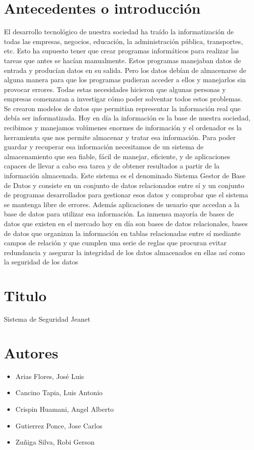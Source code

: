 \documentclass[12pt,letterpaper]{article}
\begin{document}
\section{Antecedentes o introducción}
El desarrollo tecnológico de nuestra sociedad ha traído la informatización de todas las empresas, negocios, educación, la administración pública, transportes, etc. Esto ha supuesto tener que crear programas informáticos para realizar las tareas que antes se hacían manualmente. Estos programas manejaban datos de entrada y producían datos en su salida. Pero los datos debían de almacenarse de alguna manera para que los programas pudieran acceder a ellos y manejarlos sin provocar errores. Todas estas necesidades hicieron que algunas personas y empresas comenzaran a investigar cómo poder solventar todos estos problemas. Se crearon modelos de datos que permitían representar la información real que debía ser informatizada.
Hoy en día la información es la base de nuestra sociedad, recibimos y manejamos volúmenes enormes de información y el ordenador es la herramienta que nos permite almacenar y tratar esa información.
Para poder guardar y recuperar esa información necesitamos de un sistema de almacenamiento que sea fiable, fácil de manejar, eficiente, y de aplicaciones capaces de llevar a cabo esa tarea y de obtener resultados a partir de la información almacenada.
Este sistema es el denominado Sistema Gestor de Base de Datos  y consiste en un conjunto de datos relacionados entre sí y un conjunto de programas desarrollados para gestionar esos datos y comprobar que el sistema se mantenga libre de errores. Además aplicaciones de usuario que accedan a la base de datos para utilizar esa información. La inmensa mayoría de bases de datos que existen en el mercado hoy en día son bases de datos relacionales, bases de datos que organizan la información en tablas relacionadas entre sí mediante campos de relación y que cumplen una serie de reglas que procuran evitar redundancia y asegurar la integridad de los datos almacenados en ellas así como la seguridad de los datos


\section{Titulo}
Sistema de Seguridad Jeanet

\section{Autores}
\begin{itemize}
	\item Arias Flores, José Luis  
	\item Cancino Tapia, Luis Antonio 
	\item Crispin Huamani, Angel Alberto
	\item Gutierrez Ponce, Jose Carlos
	\item Zuñiga Silva, Robi Gerson
\end{itemize}
\end{document}
